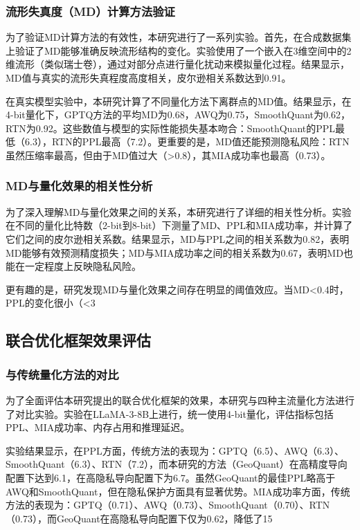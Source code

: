 \subsubsection{流形失真度（MD）计算方法验证}

为了验证MD计算方法的有效性，本研究进行了一系列实验。首先，在合成数据集上验证了MD能够准确反映流形结构的变化。实验使用了一个嵌入在3维空间中的2维流形（类似瑞士卷），通过对部分点进行量化扰动来模拟量化过程。结果显示，MD值与真实的流形失真程度高度相关，皮尔逊相关系数达到0.91。

在真实模型实验中，本研究计算了不同量化方法下离群点的MD值。结果显示，在4-bit量化下，GPTQ方法的平均MD为0.68，AWQ为0.75，SmoothQuant为0.62，RTN为0.92。这些数值与模型的实际性能损失基本吻合：SmoothQuant的PPL最低（6.3），RTN的PPL最高（7.2）。更重要的是，MD值还能预测隐私风险：RTN虽然压缩率最高，但由于MD值过大（>0.8），其MIA成功率也最高（0.73）。

\subsubsection{MD与量化效果的相关性分析}

为了深入理解MD与量化效果之间的关系，本研究进行了详细的相关性分析。实验在不同的量化比特数（2-bit到8-bit）下测量了MD、PPL和MIA成功率，并计算了它们之间的皮尔逊相关系数。结果显示，MD与PPL之间的相关系数为0.82，表明MD能够有效预测精度损失；MD与MIA成功率之间的相关系数为0.67，表明MD也能在一定程度上反映隐私风险。

更有趣的是，研究发现MD与量化效果之间存在明显的阈值效应。当MD<0.4时，PPL的变化很小（<3%

\subsection{联合优化框架效果评估}

\subsubsection{与传统量化方法的对比}

为了全面评估本研究提出的联合优化框架的效果，本研究与四种主流量化方法进行了对比实验。实验在LLaMA-3-8B上进行，统一使用4-bit量化，评估指标包括PPL、MIA成功率、内存占用和推理延迟。

实验结果显示，在PPL方面，传统方法的表现为：GPTQ（6.5）、AWQ（6.3）、SmoothQuant（6.3）、RTN（7.2），而本研究的方法（GeoQuant）在高精度导向配置下达到6.1，在高隐私导向配置下为6.7。虽然GeoQuant的最佳PPL略高于AWQ和SmoothQuant，但在隐私保护方面具有显著优势。MIA成功率方面，传统方法的表现为：GPTQ（0.71）、AWQ（0.73）、SmoothQuant（0.70）、RTN（0.73），而GeoQuant在高隐私导向配置下仅为0.62，降低了15%

